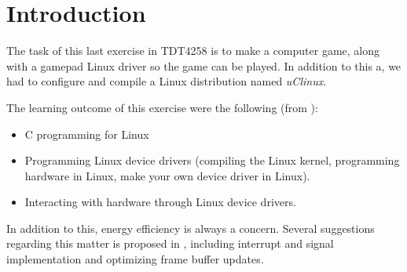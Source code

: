 \section{Introduction}
The task of this last exercise in TDT4258 is to make a computer game, along with a gamepad Linux driver so the game can be played. In addition to this a, we had to configure and compile a Linux distribution named \emph{uClinux}. 

The learning outcome of this exercise were the following (from \cite{compendium}):
\begin{itemize}
	\item C programming for Linux
	\item Programming Linux device drivers (compiling the Linux kernel, programming hardware in Linux, make your own device driver in Linux).
	\item Interacting with hardware through Linux device drivers.
\end{itemize}

In addition to this, energy efficiency is always a concern. Several suggestions regarding this matter is proposed in \cite{compendium}, including interrupt and signal implementation and optimizing frame buffer updates.
